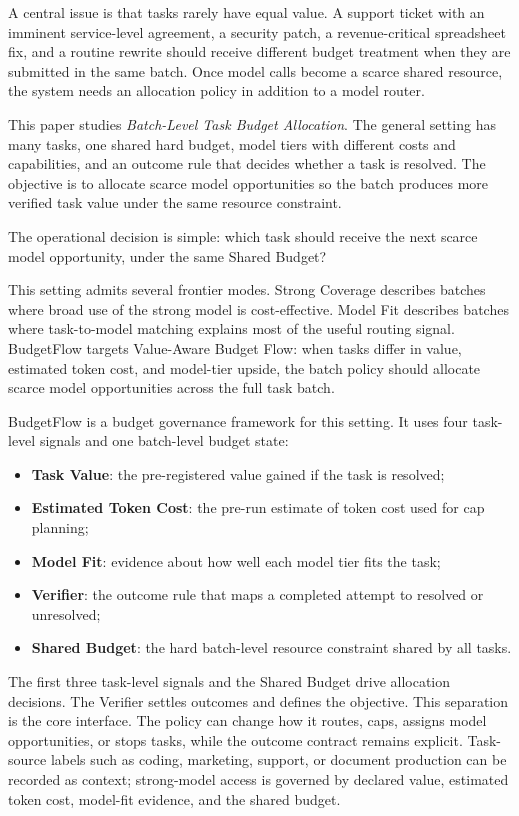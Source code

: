 \documentclass[sigconf,review,anonymous]{acmart}
\newcommand{\method}{BudgetFlow\xspace}
\newcommand{\taskvalue}{Task Value\xspace}
\newcommand{\tokencost}{Estimated Token Cost\xspace}
\newcommand{\modelfit}{Model Fit\xspace}
\newcommand{\sharedbudget}{Shared Budget\xspace}
\newcommand{\verifier}{Verifier\xspace}
\begin{document}
A central issue is that tasks rarely have equal value. A support ticket with an imminent service-level agreement, a security patch, a revenue-critical spreadsheet fix, and a routine rewrite should receive different budget treatment when they are submitted in the same batch. Once model calls become a scarce shared resource, the system needs an allocation policy in addition to a model router.

This paper studies \emph{Batch-Level Task Budget Allocation}. The general setting has many tasks, one shared hard budget, model tiers with different costs and capabilities, and an outcome rule that decides whether a task is resolved. The objective is to allocate scarce model opportunities so the batch produces more verified task value under the same resource constraint.

The operational decision is simple: which task should receive the next scarce model opportunity, under the same \sharedbudget?

This setting admits several frontier modes. Strong Coverage describes batches where broad use of the strong model is cost-effective. Model Fit describes batches where task-to-model matching explains most of the useful routing signal. \method targets Value-Aware Budget Flow: when tasks differ in value, estimated token cost, and model-tier upside, the batch policy should allocate scarce model opportunities across the full task batch.

\method is a budget governance framework for this setting. It uses four task-level signals and one batch-level budget state:

\begin{itemize}
    \item \textbf{\taskvalue}: the pre-registered value gained if the task is resolved;
    \item \textbf{\tokencost}: the pre-run estimate of token cost used for cap planning;
    \item \textbf{\modelfit}: evidence about how well each model tier fits the task;
    \item \textbf{\verifier}: the outcome rule that maps a completed attempt to resolved or unresolved;
    \item \textbf{\sharedbudget}: the hard batch-level resource constraint shared by all tasks.
\end{itemize}

The first three task-level signals and the \sharedbudget drive allocation decisions. The \verifier settles outcomes and defines the objective. This separation is the core interface. The policy can change how it routes, caps, assigns model opportunities, or stops tasks, while the outcome contract remains explicit. Task-source labels such as coding, marketing, support, or document production can be recorded as context; strong-model access is governed by declared value, estimated token cost, model-fit evidence, and the shared budget.
\end{document}
